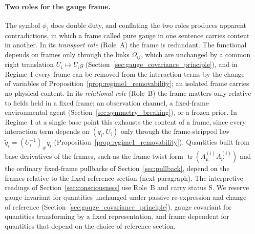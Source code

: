 \paragraph{Two roles for the gauge frame.} The symbol $\phi_i$ does double duty, and conflating the two roles produces apparent contradictions, in which a frame called pure gauge in one sentence carries content in another. In its \emph{transport role} (Role~A) the frame is redundant. The functional depends on frames only through the links $\Omega_{ij}$, which are unchanged by a common right translation $U_i \mapsto U_i g$ (Section~\ref{sec:gauge_covariance_principle}), and in Regime~I every frame can be removed from the interaction terms by the change of variables of Proposition~\ref{prop:regime1_removability}; an isolated frame carries no physical content. In its \emph{relational role} (Role~B) the frame matters only relative to fields held in a fixed frame: an observation channel, a fixed-frame environmental agent (Section~\ref{sec:symmetry_breaking}), or a frozen prior. In Regime~I at a single base point this exhausts the content of a frame, since every interaction term depends on $(q_i, U_i)$ only through the frame-stripped law $\tilde q_i = (U_i^{-1})_\# q_i$ (Proposition~\ref{prop:regime1_removability}). Quantities built from base derivatives of the frames, such as the frame-twist form $\operatorname{tr}(A^{(i)}_\mu A^{(i)}_\nu)$ and the ordinary fixed-frame pullbacks of Section~\ref{sec:pullback}, depend on the frames relative to the fixed reference section (next paragraph). The interpretive readings of Section~\ref{sec:consciousness} use Role~B and carry status S. We reserve gauge invariant for quantities unchanged under passive re-expression and change of reference (Section~\ref{sec:gauge_covariance_principle}), gauge covariant for quantities transforming by a fixed representation, and frame dependent for quantities that depend on the choice of reference section.

